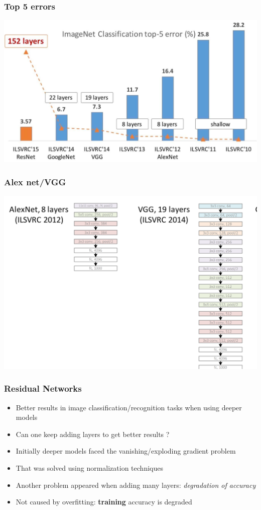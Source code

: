 \documentclass{beamer}
\begin{document}
\begin{frame}
    \frametitle{Top 5 errors}
    \includegraphics[width=\textwidth]{figs/top-5.png}
   \href{https://icml.cc/2016/tutorials/icml2016_tutorial_deep_residual_networks_kaiminghe.pdf}{}
\end{frame}



\begin{frame}
    \frametitle{Alex net/VGG}
    \includegraphics[width=\textwidth]{figs/alex-vgg.png}
   \href{https://icml.cc/2016/tutorials/icml2016_tutorial_deep_residual_networks_kaiminghe.pdf}{}
\end{frame}

\begin{frame}
	\frametitle{Residual Networks}
\begin{itemize}
	\item Better results in image classification/recognition tasks when using deeper models 
	\item Can one keep adding layers  to get better results ?
	\item Initially deeper models faced the vanishing/exploding gradient problem
	\item That was solved using normalization techniques
	\item Another problem appeared when adding many layers: \textit{degradation of accuracy}
	\item Not caused by overfitting: \textbf{training} accuracy is degraded 
\end{itemize}
\end{frame}
\end{document}
